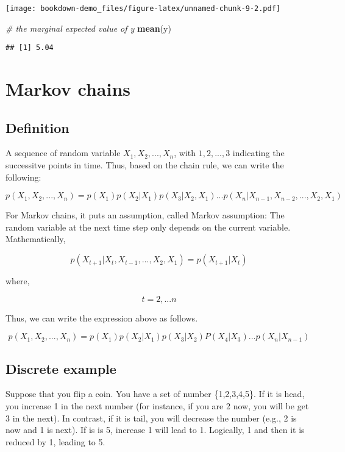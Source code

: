 \documentclass[]{book}
\newenvironment{Shaded}{\begin{snugshade}}{\end{snugshade}}
\newcommand{\KeywordTok}[1]{\textcolor[rgb]{0.13,0.29,0.53}{\textbf{#1}}}
\newcommand{\CommentTok}[1]{\textcolor[rgb]{0.56,0.35,0.01}{\textit{#1}}}
\newcommand{\NormalTok}[1]{#1}
\begin{document}
\texttt{[image: bookdown-demo\_files/figure-latex/unnamed-chunk-9-2.pdf]}

\begin{Shaded}
\begin{Highlighting}[]
\CommentTok{# the marginal expected value of y}
\KeywordTok{mean}\NormalTok{(y)}
\end{Highlighting}
\end{Shaded}

\begin{verbatim}
## [1] 5.04
\end{verbatim}

\section{Markov chains}\label{markov-chains}

\subsection{Definition}\label{definition}

A sequence of random variable \(X_1, X_2,...,X_n\), with \(1, 2, ...,3\)
indicating the successitve points in time. Thus, based on the chain
rule, we can write the following:

\[p(X_1,X_2,...,X_n)=p(X_1)p(X_2|X_1)p(X_3|X_2,X_1)...p(X_n|X_{n-1},X_{n-2},...,X_2,X_1)\]

For Markov chains, it puts an assumption, called Markov assumption: The
random variable at the next time step only depends on the current
variable. Mathematically,

\[p(X_{t+1}|X_t,X_{t-1},...,X_2,X_1)=p(X_{t+1}|X_t)\]

where,

\[t=2, ...n\]

Thus, we can write the expression above as follows.

\[p(X_1,X_2,...,X_n)=p(X_1)p(X_2|X_1)p(X_3|X_2)P(X_4|X_3)...p(X_n|X_{n-1})\]

\subsection{Discrete example}\label{discrete-example}

Suppose that you flip a coin. You have a set of number \{1,2,3,4,5\}. If
it is head, you increase 1 in the next number (for instance, if you are
2 now, you will be get 3 in the next). In contrast, if it is tail, you
will decrease the number (e.g., 2 is now and 1 is next). If is is 5,
increase 1 will lead to 1. Logically, 1 and then it is reduced by 1,
leading to 5.
\end{document}
